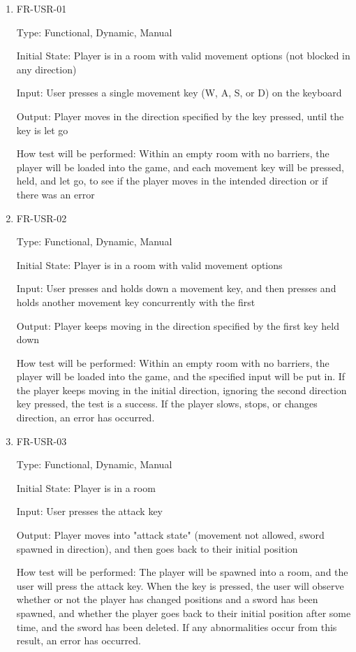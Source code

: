 \documentclass[12pt, titlepage]{article}
\begin{document}
\begin{enumerate}

\item{FR-USR-01\\}

Type: Functional, Dynamic, Manual
					
Initial State: Player is in a room with valid movement options (not blocked in any direction)
					
Input: User presses a single movement key (W, A, S, or D) on the keyboard
					
Output: Player moves in the direction specified by the key pressed, until the key is let go
					
How test will be performed: Within an empty room with no barriers, the player will be loaded into the game,
and each movement key will be pressed, held, and let go, to see if the player moves in the intended direction
or if there was an error
					
\item{FR-USR-02\\}

Type: Functional, Dynamic, Manual
					
Initial State: Player is in a room with valid movement options
					
Input: User presses and holds down a movement key, and then presses and holds another movement key
concurrently with the first
					
Output: Player keeps moving in the direction specified by the first key held down
					
How test will be performed: Within an empty room with no barriers, the player will be loaded into the game,
and the specified input will be put in. If the player keeps moving in the initial direction, ignoring the second
direction key pressed, the test is a success. If the player slows, stops, or changes direction, an error has occurred.

\item{FR-USR-03\\}

Type: Functional, Dynamic, Manual

Initial State: Player is in a room

Input: User presses the attack key

Output: Player moves into "attack state" (movement not allowed, sword spawned in direction), and then goes back to their initial position

How test will be performed: The player will be spawned into a room, and the user will press the attack key. When the key is pressed,
the user will observe whether or not the player has changed positions and a sword has been spawned, and whether the player goes back to their
initial position after some time, and the sword has been deleted. If any abnormalities occur from this result, an error has occurred.


\end{enumerate}
\end{document}
